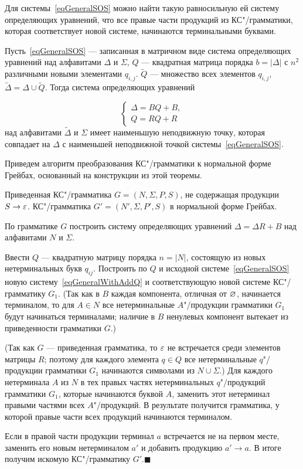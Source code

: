 Для системы~\eqref{eqGeneralSOS} можно найти такую равносильную ей систему определяющих уравнений, что все правые части продукций из КС"/грамматики, которая соответствует новой системе, начинаются терминальными буквами.

\begin{mytheorem}
Пусть~\eqref{eqGeneralSOS} --- записанная в матричном виде система определяющих уравнений над алфавитами $\Delta$ и $\Sigma$, $Q$ --- квадратная матрица порядка $b=|\Delta |$ с $n^2$ различными новыми элементами $q_{i,j}$. $\widetilde Q$ --- множество всех элементов $q_{i,j}$, $\widetilde\Delta = \Delta \cup \widetilde Q$. Тогда система определяющих уравнений

\begin{equation}
\label{eqGeneralWithAddQ}
\begin{cases}
	\Delta = BQ + B, \\
    Q = RQ + R
\end{cases}
\end{equation}
над алфавитами $\widetilde\Delta$ и $\Sigma$ имеет наименьшую неподвижную точку, которая совпадает на $\Delta$ с наименьшей неподвижной точкой системы~\eqref{eqGeneralSOS}.
\end{mytheorem}

Приведем алгоритм преобразования КС"/грамматики к нормальной форме Грейбах, основанный на конструкции из этой теоремы.

{\label{algo-Greybah}Приведенная КС"/грамматика $G=(N,\Sigma,P,S)$, не содержащая продукции $S\to\varepsilon$.}
{КС"/грамматика $G'=(N',\Sigma,P',S)$ в нормальной форме Грейбах.}
{
\item По грамматике $G$ построить систему определяющих уравнений $\Delta=\Delta R+B$ над алфавитами $N$ и $\Sigma$.

\item Ввести $Q$ --- квадратную матрицу порядка $n=|N|$, состоящую из новых нетерминальных букв $q_{ij}$. Построить по $Q$ и исходной системе~\eqref{eqGeneralSOS} новую систему~\eqref{eqGeneralWithAddQ} и соответствующую новой системе КС"/грамматику $G_1$. (Так как в $B$ каждая компонента, отличная от $\varnothing$, начинается терминалом, то для $A\in N$ все нетерминальные $A$"/продукции грамматики $G_1$ будут начинаться терминалами; наличие в $B$ ненулевых компонент вытекает из приведенности грамматики $G$.)

\item (Так как $G$ --- приведенная грамматика, то $\varepsilon$ не встречается среди элементов матрицы $R$; поэтому для каждого элемента $q\in Q$ все нетерминальные $q$"/продукции грамматики $G_1$ начинаются символами из $N\cup\Sigma$.) Для каждого нетерминала $A$ из $N$ в тех правых частях нетерминальных $q$"/продукций грамматики $G_1$, которые начинаются буквой $A$, заменить этот нетерминал правыми частями всех $A$"/продукций. В результате получится грамматика, у которой правые части всех продукций начинаются терминалом.

\item Если в правой части продукции терминал $a$ встречается не на первом месте, заменить его новым нетерминалом $a'$ и добавить продукцию $a'\to a$. В итоге получим искомую КС"/грамматику $G'$.$\blacksquare$
}

